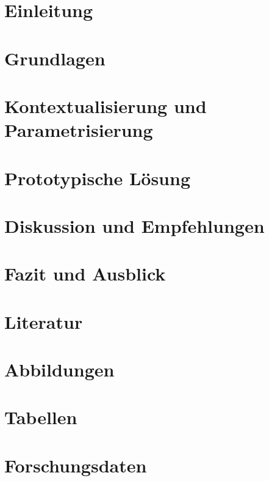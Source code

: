 \documentclass[headings=small,a4paper,12pt,oneside]{scrreprt}
\begin{document}
\singlespacing

\maketitle

\singlespacing
\tableofcontents
\restoregeometry

\singlespacing
\chapter{Einleitung}


\singlespacing 
\chapter{Grundlagen}


\singlespacing
\chapter{Kontextualisierung und Parametrisierung}


\singlespacing 
\chapter{Prototypische Lösung}


\singlespacing 
\chapter{Diskussion und Empfehlungen}


\singlespacing 
\chapter{Fazit und Ausblick}


\singlespacing 
\appendix
\chapter{Literatur}

\chapter{Abbildungen}
\chapter{Tabellen}

\chapter{Forschungsdaten}

\end{document}
